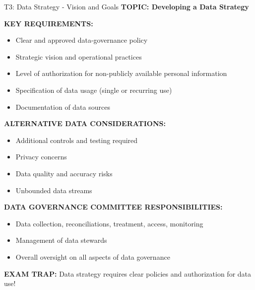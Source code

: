 \documentclass[8pt]{beamer}
\begin{document}
	\begin{frame}{T3: Data Strategy - Vision and Goals}
		\fontsize{6.5}{7.5}\selectfont
		\textbf{TOPIC: Developing a Data Strategy}
		
		\vspace{0.1cm}
		\textbf{KEY REQUIREMENTS:}
		\begin{itemize}
			\item Clear and approved data-governance policy
			\item Strategic vision and operational practices
			\item Level of authorization for non-publicly available personal information
			\item Specification of data usage (single or recurring use)
			\item Documentation of data sources
		\end{itemize}
		
		\vspace{0.1cm}
		\textbf{ALTERNATIVE DATA CONSIDERATIONS:}
		\begin{itemize}
			\item Additional controls and testing required
			\item Privacy concerns
			\item Data quality and accuracy risks
			\item Unbounded data streams
		\end{itemize}
		
		\vspace{0.1cm}
		\textbf{DATA GOVERNANCE COMMITTEE RESPONSIBILITIES:}
		\begin{itemize}
			\item Data collection, reconciliations, treatment, access, monitoring
			\item Management of data stewards
			\item Overall oversight on all aspects of data governance
		\end{itemize}
		
		\textcolor{myred}{\textbf{EXAM TRAP:}} Data strategy requires \textcolor{myblue}{clear policies and authorization} for data use!
	\end{frame}
	
\end{document}
